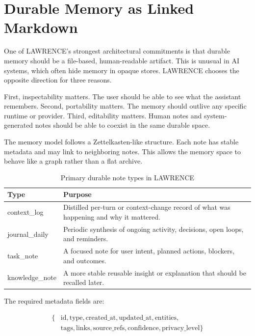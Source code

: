 \documentclass[conference]{IEEEtran}
\begin{document}
\section{Durable Memory as Linked Markdown}
One of LAWRENCE's strongest architectural commitments is that durable memory should be a file-based, human-readable artifact. This is unusual in AI systems, which often hide memory in opaque stores. LAWRENCE chooses the opposite direction for three reasons.

First, inspectability matters. The user should be able to see what the assistant remembers. Second, portability matters. The memory should outlive any specific runtime or provider. Third, editability matters. Human notes and system-generated notes should be able to coexist in the same durable space.

The memory model follows a Zettelkasten-like structure. Each note has stable metadata and may link to neighboring notes. This allows the memory space to behave like a graph rather than a flat archive.

\begin{table}[t]
\caption{Primary durable note types in LAWRENCE}
\label{tab:noteschema}
\centering
\begin{tabular}{p{} p{}}
\toprule
\textbf{Type} & \textbf{Purpose} \\
\midrule
context\_log & Distilled per-turn or context-change record of what was happening and why it mattered. \\
journal\_daily & Periodic synthesis of ongoing activity, decisions, open loops, and reminders. \\
task\_note & A focused note for user intent, planned actions, blockers, and outcomes. \\
knowledge\_note & A more stable reusable insight or explanation that should be recalled later. \\
\bottomrule
\end{tabular}
\end{table}

The required metadata fields are:

\begin{equation}
\begin{aligned}
\{&\text{id}, \text{type}, \text{created\_at}, \text{updated\_at}, \text{entities},\\
&\text{tags}, \text{links}, \text{source\_refs}, \text{confidence}, \text{privacy\_level}\}
\end{aligned}
\end{equation}
\end{document}

